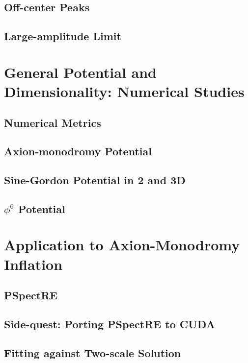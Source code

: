 \documentclass{report}
\begin{document}
\section{Off-center Peaks}
\section{Large-amplitude Limit}

\chapter{General Potential and Dimensionality: Numerical Studies}
\section{Numerical Metrics}
\section{Axion-monodromy Potential}
\section{Sine-Gordon Potential in 2 and 3D}
\section{$\phi^6$ Potential}

\chapter{Application to Axion-Monodromy Inflation}
\section{PSpectRE}
\section{Side-quest: Porting PSpectRE to CUDA}
\section{Fitting against Two-scale Solution}
\end{document}
